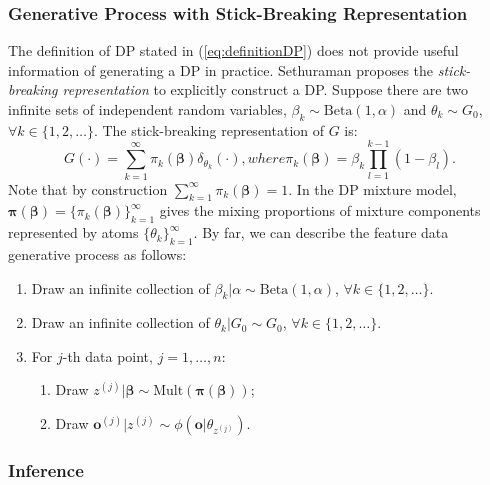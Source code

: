 \subsubsection{Generative Process with Stick-Breaking Representation}

The definition of DP stated in (\ref{eq:definitionDP}) does not provide useful information of generating a DP in practice. Sethuraman \cite{sethuraman94} proposes the \textit{stick-breaking representation} to explicitly construct a DP. Suppose there are two infinite sets of independent random variables, $\beta_k \sim \text{Beta}(1, \alpha)$ and $\theta_k \sim G_0$, $\forall k \in \{1,2,\dots\}$. The stick-breaking representation of $G$ is:
\begin{subequations}
\begin{equation}
G(\cdot) = \sum_{k=1}^\infty \pi_k (\bm \beta) \delta_{\theta_k}(\cdot),
\end{equation}
where
\begin{equation}
\pi_k (\bm \beta) = \beta_k \prod_{l=1}^{k-1} (1-\beta_l).
\end{equation}
\end{subequations}
Note that by construction $\sum_{k=1}^\infty \pi_k (\bm \beta) = 1$. In the DP mixture model, $\bm\pi (\bm\beta) = \{ \pi_k (\bm \beta) \}_{k=1}^\infty$ gives the mixing proportions of mixture components represented by atoms $\{ \theta_k \}_{k=1}^\infty$. By far, we can describe the feature data generative process as follows:
\begin{enumerate}
\item Draw an infinite collection of $\beta_k | \alpha \sim \text{Beta} (1, \alpha)$, $\forall k \in \{1,2,\dots\}$.
\item Draw an infinite collection of $\theta_k | G_0 \sim G_0$, $\forall k \in \{1,2,\dots\}$.
\item For $j$-th data point, $j = 1,\dots, n$:
	\begin{enumerate}
	\item Draw $z^{(j)} | \bm\beta \sim \text{Mult} (\bm\pi (\bm\beta))$;
	\item Draw $\mathbf{o}^{(j)} | z^{(j)} \sim \phi ( \mathbf{o} | \theta_{z^{{(j)}}})$.
	\end{enumerate}
\end{enumerate} 

\subsubsection{Inference}

